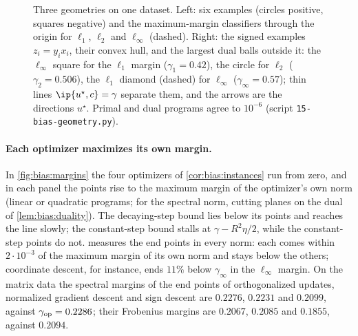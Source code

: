 \begin{refsection}
\begin{figure}[t]
\begin{fullwidth}
\begin{tikzpicture}
\end{tikzpicture}
\end{fullwidth}
\caption{Three geometries on one dataset. Left: six examples (circles positive, squares negative) and the maximum-margin classifiers through the origin for $\ell_1$, $\ell_2$ and $\ell_\infty$ (dashed). Right: the signed examples $z_i=y_ix_i$, their convex hull, and the largest dual balls outside it: the $\ell_\infty$ square for the $\ell_1$ margin ($\gamma_1=0.42$), the circle for $\ell_2$ ($\gamma_2=0.506$), the $\ell_1$ diamond (dashed) for $\ell_\infty$ ($\gamma_\infty=0.57$); thin lines $\ip{u^\star,c}=\gamma$ separate them, and the arrows are the directions $u^\star$. Primal and dual programs agree to $10^{-6}$ (script \texttt{15-bias-geometry.py}).}
\label{fig:bias:geometry}
\end{figure}

\paragraph{Each optimizer maximizes its own margin.} In \cref{fig:bias:margins} the four optimizers of \cref{cor:bias:instances} run from zero, and in each panel the points rise to the maximum margin of the optimizer's own norm (linear or quadratic programs; for the spectral norm, cutting planes on the dual of \cref{lem:bias:duality}). The decaying-step bound lies below its points and reaches the line slowly; the constant-step bound stalls at $\gamma-R^2\eta/2$, while the constant-step points do not.  measures the end points in every norm: each comes within $2\cdot10^{-3}$ of the maximum margin of its own norm and stays below the others; coordinate descent, for instance, ends $11\%$ below $\gamma_\infty$ in the $\ell_\infty$ margin. On the matrix data the spectral margins of the end points of orthogonalized updates, normalized gradient descent and sign descent are $0.2276$, $0.2231$ and $0.2099$, against $\gamma_{\mathrm{op}}=0.2286$; their Frobenius margins are $0.2067$, $0.2085$ and $0.1855$, against $0.2094$.


\end{refsection}
